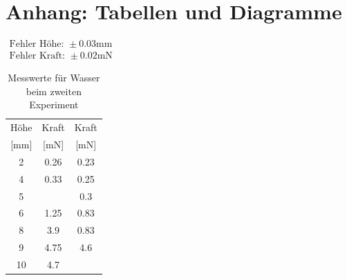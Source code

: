 \documentclass[11pt,a4paper]{article}
\begin{document}
\pagebreak

\section{Anhang: Tabellen und Diagramme}

\begin{table}[h]
\centering
$\begin{array}{l}
\textrm{Fehler Höhe: } \pm 0.03 \textrm{mm}\\
\textrm{Fehler Kraft: } \pm 0.02 \textrm{mN}
\end{array}$
\begin{tabular}{|c|c|c|}
\hline
\textrm{H\"ohe}& \textrm{Kraft} & \textrm{Kraft} \\
\textrm{[mm]} & \textrm{[mN]}& \textrm{[mN]}\\
\hline 
2 & 0.26 & 0.23\\
\hline
4 & 0.33 & 0.25\\
\hline 
5 & & 0.3\\
\hline 
6 & 1.25 & 0.83\\
\hline 
8 & 3.9 & 0.83\\ 
\hline
9 & 4.75 & 4.6\\ 
\hline
10 & 4.7 &\\ 
\hline
\end{tabular}
\caption{Messwerte für Wasser beim zweiten Experiment}
\label{tabmw}
\end{table}
\end{document}
